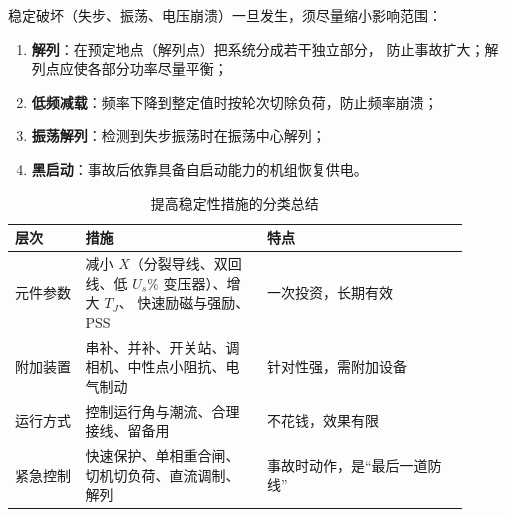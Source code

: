 稳定破坏（失步、振荡、电压崩溃）一旦发生，须尽量缩小影响范围：
\begin{enumerate}
  \item \textbf{解列}：在预定地点（解列点）把系统分成若干独立部分，
        防止事故扩大；解列点应使各部分功率尽量平衡；
  \item \textbf{低频减载}：频率下降到整定值时按轮次切除负荷，防止频率崩溃；
  \item \textbf{振荡解列}：检测到失步振荡时在振荡中心解列；
  \item \textbf{黑启动}：事故后依靠具备自启动能力的机组恢复供电。
\end{enumerate}

\begin{table}[htbp]
  \centering
  \caption{提高稳定性措施的分类总结}
  \small
  \begin{tabular}{@{}p{0.14\linewidth}p{0.36\linewidth}p{0.40\linewidth}@{}}
    \toprule
    层次 & 措施 & 特点 \\
    \midrule
    元件参数 & 减小 $X$（分裂导线、双回线、低 $U_s\%$ 变压器）、增大 $T_J$、
      快速励磁与强励、PSS & 一次投资，长期有效 \\
    附加装置 & 串补、并补、开关站、调相机、中性点小阻抗、电气制动 & 针对性强，需附加设备 \\
    运行方式 & 控制运行角与潮流、合理接线、留备用 & 不花钱，效果有限 \\
    紧急控制 & 快速保护、单相重合闸、切机切负荷、直流调制、解列 & 事故时动作，是“最后一道防线” \\
    \bottomrule
  \end{tabular}
\end{table}

